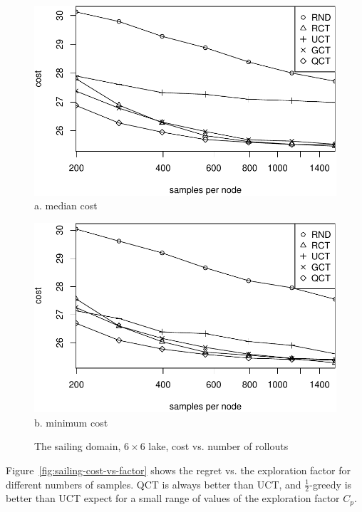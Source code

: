 \documentclass{article}
\begin{document}
\begin{figure}[t]
  \begin{minipage}[b]{0.5\linewidth}
    \centering
    \includegraphics[scale=0.45]{costs-size=6-group=median.pdf}\\
    a. median cost
  \end{minipage}
  \begin{minipage}[b]{0.5\linewidth}
    \centering
    \includegraphics[scale=0.45]{costs-size=6-group=minimum.pdf}\\
    b. minimum cost
  \end{minipage}
  \caption{The sailing domain, $6\times 6$ lake, cost vs. number of rollouts}
  \label{fig:sailing-cost-vs-nsamples}
\end{figure}

Figure~\ref{fig:sailing-cost-vs-factor} shows the regret vs. the
exploration factor for different numbers of samples. QCT is always better than
UCT, and $\frac 1 2$-greedy is better than UCT expect for a small range of
values of the exploration factor $C_p$. 
\end{document}
